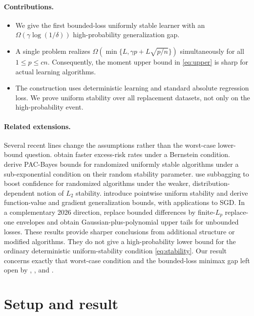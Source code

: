 \documentclass{article}
\newcommand{\1}{\mathbf 1}
\begin{document}
\paragraph{Contributions.}

\begin{itemize}[leftmargin=*,itemsep=2pt]
\item We give the first bounded-loss uniformly stable learner with an
$\Omega(\gamma\log(1/\delta))$ high-probability generalization gap.
\item A single problem realizes
$\Omega(\min\{L,\gamma p+L\sqrt{p/n}\})$ simultaneously for all $1\le p\le cn$. Consequently, the moment upper bound in \eqref{eq:upper} is sharp for actual learning algorithms.
\item The construction uses deterministic learning and standard absolute regression loss. We prove
uniform stability over all replacement datasets, not only on the high-probability event.
\end{itemize}

\paragraph{Related extensions.}
Several recent lines change the assumptions rather than the worst-case lower-bound question. \citet{klochkov2021} obtain faster excess-risk rates under a Bernstein condition. \citet{zhou2023pacbayes} derive PAC-Bayes bounds for randomized uniformly stable algorithms under a sub-exponential condition on their random stability parameter. \citet{yuanli2022} use subbagging to boost confidence for randomized algorithms under the weaker, distribution-dependent notion of $L_2$ stability. \citet{fanlei2024} introduce pointwise uniform stability and derive function-value and gradient generalization bounds, with applications to SGD. In a complementary 2026 direction, \citet{lei2026lp} replace bounded differences by finite-$L_p$ replace-one envelopes and obtain Gaussian-plus-polynomial upper tails for unbounded losses. These results provide sharper conclusions from additional structure or modified algorithms. They do not give a high-probability lower bound for the ordinary deterministic uniform-stability condition \eqref{eq:stability}. Our result concerns exactly that worst-case condition and the bounded-loss minimax gap left open by \citet{bousquet2020}, \citet{liulu2021}, and \citet{nguyen2026}.

\section{Setup and result}
\end{document}

